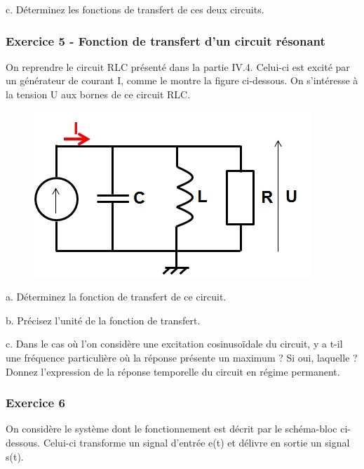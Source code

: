\documentclass[11pt]{report}
\begin{document}
 	c. Déterminez les fonctions de transfert de ces deux circuits.
 	
 	\vspace{1\baselineskip}
 	
 	\subsubsection{Exercice 5 - Fonction de transfert d'un circuit résonant}
 	
 	On reprendre le circuit RLC présenté dans la partie IV.4. Celui-ci est excité par un générateur de courant I, comme le montre la figure ci-dessous. On s'intéresse à la tension U aux bornes de ce circuit RLC. 
 	 	
 	\begin{figure}[h!]
 		\centering
 		\includegraphics[scale=0.5]{images/Exo_2_5.jpg} 
 	\end{figure} 
 
 	a. Déterminez la fonction de transfert de ce circuit. 
 	
 	b. Précisez l'unité de la fonction de transfert. 
 	
 	c. Dans le cas où l'on considère une excitation cosinusoïdale du circuit, y a t-il une fréquence particulière où la réponse présente un maximum ? Si oui, laquelle ? Donnez l'expression de la réponse temporelle du circuit en régime permanent.
 	
 	\vspace{1\baselineskip}
 	
 	\subsubsection{Exercice 6}
 	
 	On considère le système dont le fonctionnement est décrit par le schéma-bloc ci-dessous. Celui-ci transforme un signal d'entrée e(t) et délivre en sortie un signal s(t). 
 	
\end{document}

